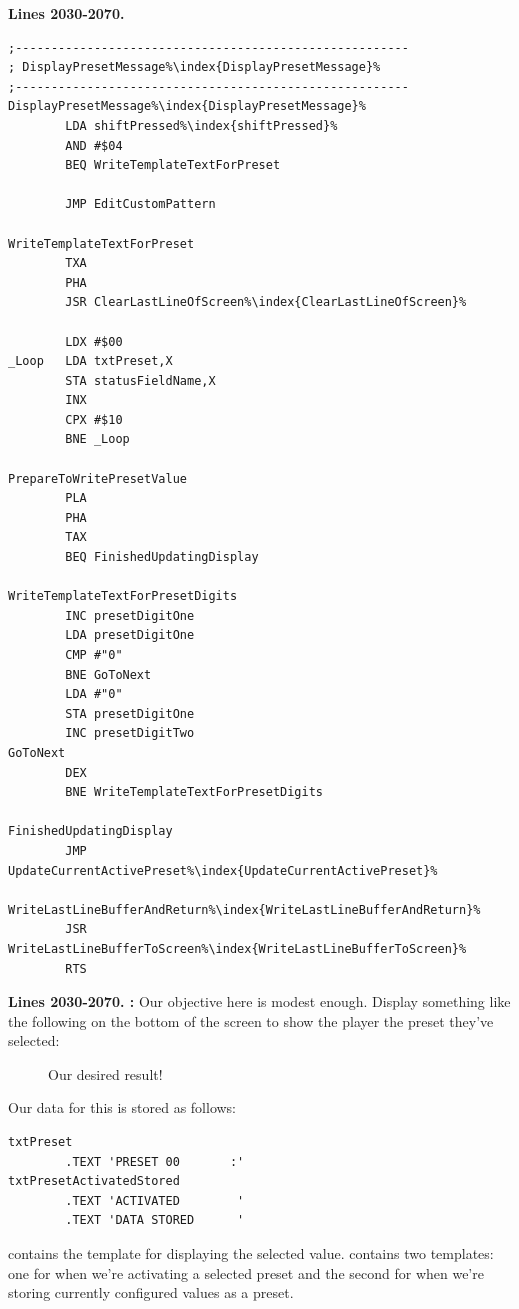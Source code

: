 \clearpage
\textbf{Lines 2030-2070. } 
\begin{lstlisting}[escapechar=\%]
;-------------------------------------------------------
; DisplayPresetMessage%\index{DisplayPresetMessage}%
;-------------------------------------------------------
DisplayPresetMessage%\index{DisplayPresetMessage}%    
        LDA shiftPressed%\index{shiftPressed}%
        AND #$04
        BEQ WriteTemplateTextForPreset

        JMP EditCustomPattern

WriteTemplateTextForPreset
        TXA 
        PHA 
        JSR ClearLastLineOfScreen%\index{ClearLastLineOfScreen}%

        LDX #$00
_Loop   LDA txtPreset,X
        STA statusFieldName,X
        INX 
        CPX #$10
        BNE _Loop

PrepareToWritePresetValue
        PLA 
        PHA 
        TAX 
        BEQ FinishedUpdatingDisplay

WriteTemplateTextForPresetDigits   
        INC presetDigitOne
        LDA presetDigitOne
        CMP #"0"
        BNE GoToNext
        LDA #"0"
        STA presetDigitOne
        INC presetDigitTwo
GoToNext   
        DEX 
        BNE WriteTemplateTextForPresetDigits

FinishedUpdatingDisplay   
        JMP UpdateCurrentActivePreset%\index{UpdateCurrentActivePreset}%

WriteLastLineBufferAndReturn%\index{WriteLastLineBufferAndReturn}%    
        JSR WriteLastLineBufferToScreen%\index{WriteLastLineBufferToScreen}%
        RTS 
\end{lstlisting}
\clearpage

\textbf{Lines 2030-2070. :} Our objective here is modest enough. Display something like the following
on the bottom of the screen to show the player the preset they've selected:
\begin{figure}[H]                                                          
  \centering                                                             
\caption{Our desired result!}
\end{figure}                                                               
Our data for this is stored as follows:
\begin{lstlisting}[escapechar=\%]
txtPreset
        .TEXT 'PRESET 00       :'
txtPresetActivatedStored
        .TEXT 'ACTIVATED        '
        .TEXT 'DATA STORED      '
\end{lstlisting}
 contains the template for displaying the selected value.  contains two templates: one for
when we're activating a selected preset and the second for when we're storing currently configured values as a preset.

